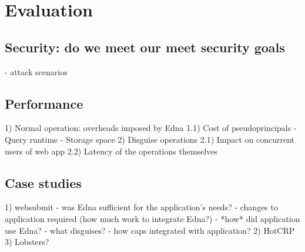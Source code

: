 \section{Evaluation}

\subsection{Security: do we meet our meet security goals}
   - attack scenarios

\subsection{Performance}


   1) Normal operation: overheads imposed by Edna
    1.1) Cost of pseudoprincipals
         - Query runtime
         - Storage space
   2) Disguise operations
    2.1) Impact on concurrent users of web app
    2.2) Latency of the operations themselves

\subsection{Case studies}
   1) websubmit
      - was Edna sufficient for the application's needs?
      - changes to application required (how much work to integrate Edna?)
      - *how* did application use Edna?
        - what disguises?
        - how caps integrated with application?
   2) HotCRP
   3) Lobsters?

   \iffalse
\begin{figure*}[t!]
    \centering
    \texttt{[image: figs/results\_20lec]}
    \caption{20 lectures, 4 questions/lecture: Results of performing disguise actions with varying numbers of users.}
\end{figure*}

\begin{figure*}[t!]
    \centering
    \texttt{[image: figs/results\_40lec]}
    \caption{40 lectures, 4 questions/lecture: Results of performing disguise actions with varying numbers of users.}
\end{figure*}
\fi
